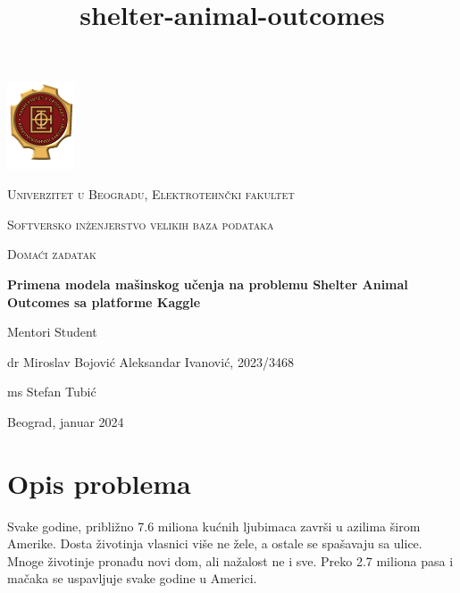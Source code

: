 \documentclass[11pt]{article}
\title{shelter-animal-outcomes}
\begin{document}
    
\begin{titlepage}
	\centering
	\includegraphics[width=0.15\textwidth]{LogoETF.png}\par\vspace{1cm}
	{\LARGE \textsc{Univerzitet u Beogradu, Elektrotehnčki fakultet}\par}
	\vspace{0.5cm}
	{\Large \textsc{Softversko inženjerstvo velikih baza podataka}\par}
    \vspace{0.5cm}
    {\Large \textsc{Domaći zadatak}\par}
	\vspace{1.5cm}
	{\huge\bfseries Primena modela mašinskog učenja na problemu Shelter Animal Outcomes sa platforme Kaggle\par}
	\vspace{2cm}
	\vfill

    \vfill \vfill
    Mentori \hspace*{\fill} Student \par
    dr Miroslav Bojović \hspace*{\fill} Aleksandar Ivanović, 2023/3468 \par
    ms Stefan Tubić \hspace*{\fill}\par
	\vfill
	{\large Beograd, januar 2024\par}
\end{titlepage}
    
    
\hypersetup{pdfborder=0 0 0}

\tableofcontents

\newpage
    
    \hypertarget{opis-problema}{%
\section{Opis problema}\label{opis-problema}}

Svake godine, približno 7.6 miliona kućnih ljubimaca završi u azilima
širom Amerike. Dosta životinja vlasnici više ne žele, a ostale se
spašavaju sa ulice. Mnoge životinje pronađu novi dom, ali nažalost ne i
sve. Preko 2.7 miliona pasa i mačaka se uspavljuje svake godine u
Americi.
\end{document}
